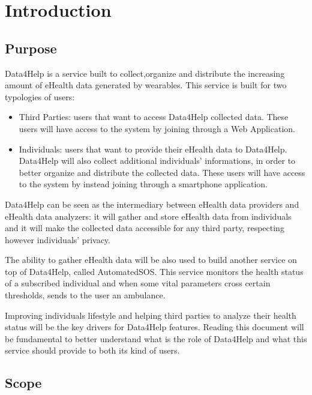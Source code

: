 
\chapter{Introduction}
\section{Purpose}
Data4Help is a service built to collect,organize and distribute the increasing amount of eHealth data generated by wearables.
\givespace
This service is built for two typologies of users:
\begin{itemize}
\item Third Parties: users that want to access Data4Help collected data. These users will have access to the system by joining through a Web Application.
\item Individuals: users that want to provide their eHealth data to Data4Help. Data4Help will also collect additional individuals' informations, in order to better organize and distribute the collected data.
These users will have access to the system by instead joining through a smartphone application.
\end{itemize}
Data4Help can be seen as the intermediary between eHealth data providers and eHealth data analyzers: it will gather  and store eHealth data from individuals and it will make the collected data accessible for any third party, respecting however individuals' privacy.
\givespace

The ability to gather eHealth data will be also used to build another service on top of Data4Help, called AutomatedSOS.
This service monitors the health status of a subscribed individual and when some vital parameters cross certain thresholds, sends to the user an ambulance.
\givespace

Improving individuals lifestyle and helping third parties to analyze their health status will be the key drivers for Data4Help features.
\givespace
Reading this document will be fundamental to better understand what is the role of Data4Help and what this service should provide to both its kind of users.





\section{Scope}
